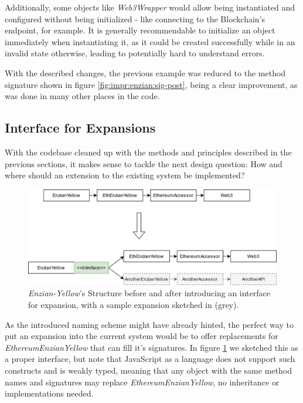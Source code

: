 Additionally, some objects like \emph{Web3Wrapper} would allow being instantiated and configured without being initialized - like connecting to the Blockchain's endpoint, for example. It is generally recommendable to initialize an object immediately when instantiating it, as it could be created successfully while in an invalid state otherwise, leading to potentially hard to understand errors.

With the described changes, the previous example was reduced to the method signature shown in figure \ref{fig:impr:enzian:sig-post}, being a clear improvement, as was done in many other places in the code.

\subsection{Interface for Expansions}
\label{sec:impr:enzian:exp}

With the codebase cleaned up with the methods and principles described in the previous sections, it makes sense to tackle the next design question: How and where should an extension to the existing system be implemented?

\begin{figure}[h]
	\centering
	\captionsetup{justification=centering,margin=2cm}
	\includegraphics[width=\textwidth]{gfx/enzian-expansion}
	\caption{\emph{Enzian-Yellow}'s Structure before and after introducing an interface for expansion, with a sample expansion sketched in (grey).}
	\label{fig:impr:enzian:expansion}
\end{figure}

As the introduced naming scheme might have already hinted, the perfect way to put an expansion into the current system would be to offer replacements for \emph{EthereumEnzianYellow} that can fill it's signatures. In figure \ref{fig:impr:enzian:expansion} we sketched this as a proper interface, but note that JavaScript as a language does not support such constructs and is weakly typed, meaning that any object with the same method names and signatures may replace \emph{EthereumEnzianYellow}, no inheritance or implementations needed.

